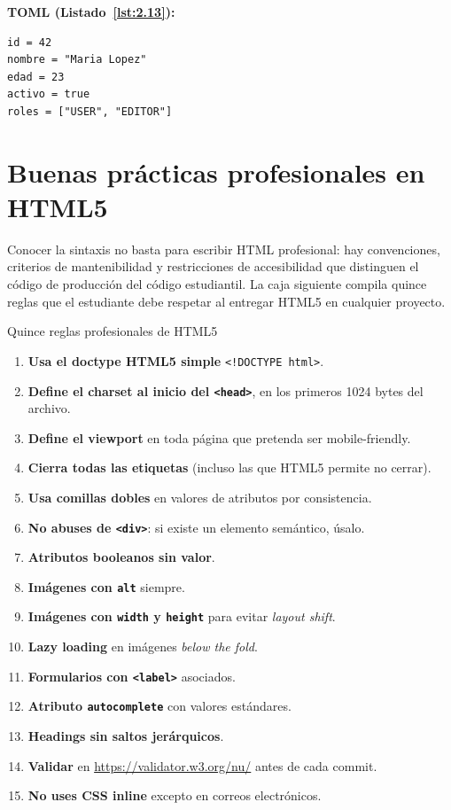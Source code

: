 \documentclass[11pt,a4paper,openany]{book}
\begin{document}
\textbf{TOML (Listado~\ref{lst:2.13}):}
\begin{lstlisting}[style=shell,numbers=none,caption={Ejemplo de Shell},label=lst:2.13]
id = 42
nombre = "Maria Lopez"
edad = 23
activo = true
roles = ["USER", "EDITOR"]
\end{lstlisting}

\section{Buenas prácticas profesionales en HTML5}

Conocer la sintaxis no basta para escribir HTML profesional:
hay convenciones, criterios de mantenibilidad y restricciones de
accesibilidad que distinguen el código de producción del código
estudiantil. La caja siguiente compila quince reglas que el
estudiante debe respetar al entregar HTML5 en cualquier proyecto.


\begin{cajabuenas}{Quince reglas profesionales de HTML5}
\begin{enumerate}
\item \textbf{Usa el doctype HTML5 simple} \texttt{<!DOCTYPE html>}.
\item \textbf{Define el charset al inicio del \texttt{<head>}}, en
los primeros 1024 bytes del archivo.
\item \textbf{Define el viewport} en toda página que pretenda ser
mobile-friendly.
\item \textbf{Cierra todas las etiquetas} (incluso las que HTML5
permite no cerrar).
\item \textbf{Usa comillas dobles} en valores de atributos por
consistencia.
\item \textbf{No abuses de \texttt{<div>}}: si existe un elemento
semántico, úsalo.
\item \textbf{Atributos booleanos sin valor}.
\item \textbf{Imágenes con \texttt{alt}} siempre.
\item \textbf{Imágenes con \texttt{width} y \texttt{height}} para
evitar \emph{layout shift}.
\item \textbf{Lazy loading} en imágenes \emph{below the fold}.
\item \textbf{Formularios con \texttt{<label>}} asociados.
\item \textbf{Atributo \texttt{autocomplete}} con valores estándares.
\item \textbf{Headings sin saltos jerárquicos}.
\item \textbf{Validar} en \url{https://validator.w3.org/nu/} antes
de cada commit.
\item \textbf{No uses CSS inline} excepto en correos electrónicos.
\end{enumerate}
\end{cajabuenas}
\end{document}
